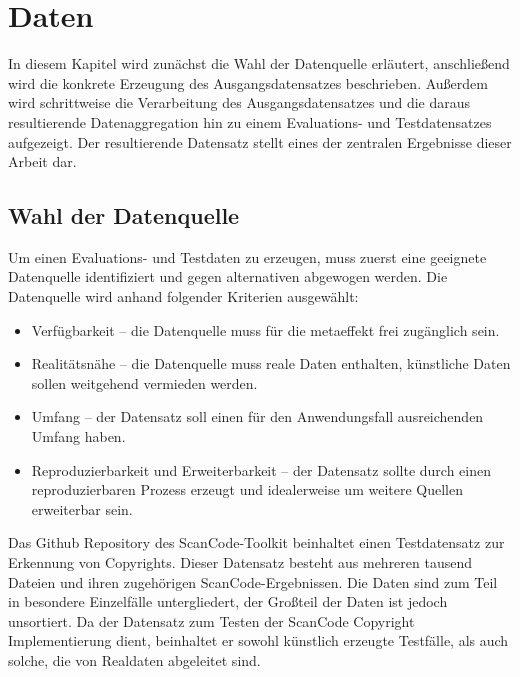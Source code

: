 \chapter{Daten}\label{ch:daten}

In diesem Kapitel wird zunächst die Wahl der Datenquelle erläutert, anschließend wird die konkrete Erzeugung des Ausgangsdatensatzes beschrieben.
Außerdem wird schrittweise die Verarbeitung des Ausgangsdatensatzes und die daraus resultierende Datenaggregation hin zu einem Evaluations- und Testdatensatzes aufgezeigt.
Der resultierende Datensatz stellt eines der zentralen Ergebnisse dieser Arbeit dar.


\section{Wahl der Datenquelle}\label{sec:wahl-der-datenquelle}

Um einen Evaluations- und Testdaten zu erzeugen, muss zuerst eine geeignete Datenquelle identifiziert und gegen alternativen abgewogen werden.
Die Datenquelle wird anhand folgender Kriterien ausgewählt:
\begin{itemize}
    \item Verfügbarkeit -- die Datenquelle muss für die metaeffekt frei zugänglich sein.
    \item Realitätsnähe -- die Datenquelle muss reale Daten enthalten, künstliche Daten sollen weitgehend vermieden werden.
    \item Umfang -- der Datensatz soll einen für den Anwendungsfall ausreichenden Umfang haben.
    \item Reproduzierbarkeit und Erweiterbarkeit -- der Datensatz sollte durch einen reproduzierbaren Prozess erzeugt und idealerweise um weitere Quellen erweiterbar sein.
\end{itemize}

Das Github Repository des ScanCode-Toolkit beinhaltet einen Testdatensatz zur Erkennung von Copyrights.
Dieser Datensatz besteht aus mehreren tausend Dateien und ihren zugehörigen ScanCode-Ergebnissen.
Die Daten sind zum Teil in besondere Einzelfälle untergliedert, der Großteil der Daten ist jedoch unsortiert.
Da der Datensatz zum Testen der ScanCode Copyright Implementierung dient, beinhaltet er sowohl künstlich erzeugte Testfälle, als auch solche, die von Realdaten abgeleitet sind.

